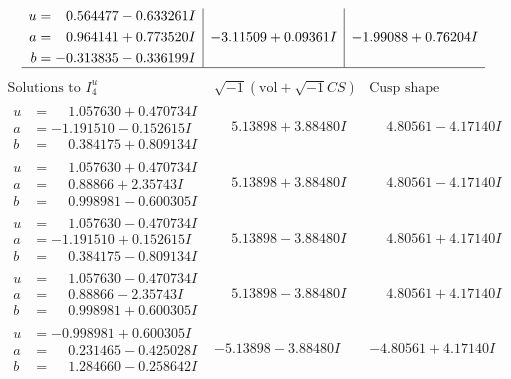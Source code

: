 \documentclass[1p]{elsarticle_modified}
\theoremstyle{definition}
\newcommand{\I}{\sqrt{-1}}
\begin{document}
$$\begin{array}{c|c|c}
\begin{aligned}
u &= \phantom{-}0.564477 - 0.633261 I \\
a &= \phantom{-}0.964141 + 0.773520 I \\
b &= -0.313835 - 0.336199 I\end{aligned}
 & -3.11509 + 0.09361 I & -1.99088 + 0.76204 I\\
 \hline 
 \end{array}$$\newpage$$\begin{array}{c|c|c}  
\text{Solutions to }I^u_{4}& \I (\text{vol} + \sqrt{-1}CS) & \text{Cusp shape}\\
 \hline 
\begin{aligned}
u &= \phantom{-}1.057630 + 0.470734 I \\
a &= -1.191510 - 0.152615 I \\
b &= \phantom{-}0.384175 + 0.809134 I\end{aligned}
 & \phantom{-}5.13898 + 3.88480 I & \phantom{-}4.80561 - 4.17140 I \\ \hline\begin{aligned}
u &= \phantom{-}1.057630 + 0.470734 I \\
a &= \phantom{-}0.88866 + 2.35743 I \\
b &= \phantom{-}0.998981 - 0.600305 I\end{aligned}
 & \phantom{-}5.13898 + 3.88480 I & \phantom{-}4.80561 - 4.17140 I \\ \hline\begin{aligned}
u &= \phantom{-}1.057630 - 0.470734 I \\
a &= -1.191510 + 0.152615 I \\
b &= \phantom{-}0.384175 - 0.809134 I\end{aligned}
 & \phantom{-}5.13898 - 3.88480 I & \phantom{-}4.80561 + 4.17140 I \\ \hline\begin{aligned}
u &= \phantom{-}1.057630 - 0.470734 I \\
a &= \phantom{-}0.88866 - 2.35743 I \\
b &= \phantom{-}0.998981 + 0.600305 I\end{aligned}
 & \phantom{-}5.13898 - 3.88480 I & \phantom{-}4.80561 + 4.17140 I \\ \hline\begin{aligned}
u &= -0.998981 + 0.600305 I \\
a &= \phantom{-}0.231465 - 0.425028 I \\
b &= \phantom{-}1.284660 - 0.258642 I\end{aligned}
 & -5.13898 - 3.88480 I & -4.80561 + 4.17140 I \\ \hline\begin{aligned}

\end{aligned}
\end{array}$$
\end{document}

